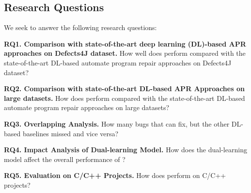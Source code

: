 \subsection{Research Questions}

We seek to answer the following research questions:

\noindent\textbf{RQ1. Comparison with state-of-the-art deep learning
  (DL)-based APR approaches on Defects4J dataset.}  How well does
                {\tool} perform compared with the state-of-the-art
               DL-based automate program repair approaches on Defects4J
                dataset?


\noindent\textbf{RQ2. Comparison with state-of-the-art DL-based APR Approaches on large datasets.}  
How does {\tool} perform compared with the state-of-the-art DL-based automate program repair
approaches on large datasets?


\noindent\textbf{RQ3. Overlapping Analysis.} How many bugs that
{\tool} can fix, but the other DL-based baselines
                missed and vice versa?

\noindent\textbf{RQ4. Impact Analysis of Dual-learning Model.} How does the dual-learning model affect the overall performance of {\tool}?


\noindent\textbf{RQ5. Evaluation on C/C++ Projects.} How does {\tool} perform on C/C++ projects?
